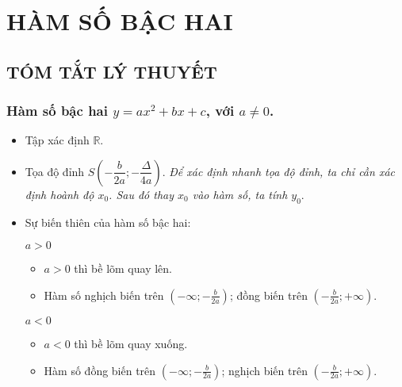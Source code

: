 \section{ HÀM SỐ BẬC HAI}
\subsection{TÓM TẮT LÝ THUYẾT}

\subsubsection{Hàm số bậc hai $y=ax^2+bx+c$, với $a \ne 0$.}
\begin{itemize}
	\item[\ding{172}] Tập xác định $\mathbb{R}$.
	\item [\ding{173}] Tọa độ đỉnh $S\left(-\dfrac{b}{2a};-\dfrac{\Delta}{4a} \right)$. \textit{Để xác định nhanh tọa độ đỉnh, ta chỉ cần xác định hoành độ $x_0$. Sau đó thay $x_0$ vào hàm số, ta tính $y_0$}.
	\item [\ding{174}] Sự biến thiên của hàm số bậc hai:\\
	\begin{minipage}[b]{7cm}
		\begin{khung4}{$a>0$}
			\begin{itemize}
				\item $a>0$ thì bề lõm quay lên.
				\item Hàm số nghịch biến trên $\left(-\infty;-\frac{b}{2a} \right)$; đồng biến trên $\left(-\frac{b}{2a};+\infty \right)$.
			\end{itemize}
		\end{khung4}
	\end{minipage}\hspace{1cm}
	\begin{minipage}[b]{7cm}
		\begin{khung4}{$a<0$}
			\begin{itemize}
				\item $a<0$ thì bề lõm quay xuống.
				\item Hàm số đồng biến trên $\left(-\infty;-\frac{b}{2a} \right)$; nghịch biến trên $\left(-\frac{b}{2a};+\infty \right)$.
			\end{itemize}
		\end{khung4}
	\end{minipage}
\end{itemize}

